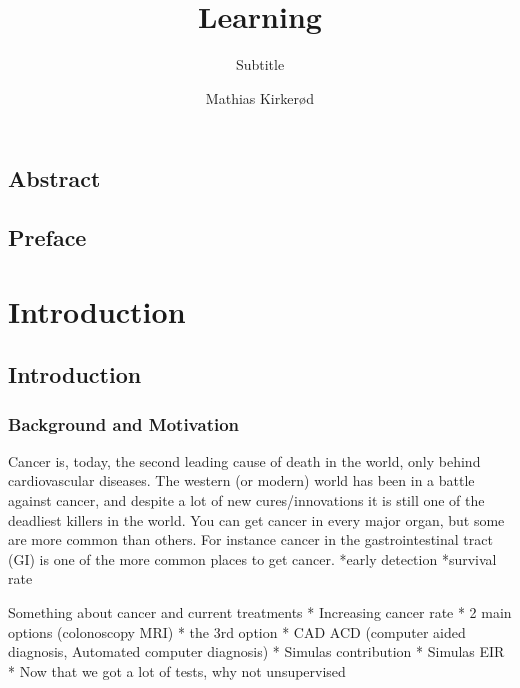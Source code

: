 \documentclass[a4paper,english]{ifimaster}
\title{Learning}
\subtitle{Subtitle}
\author{Mathias Kirkerød}
\begin{document}
\duoforside[dept={Department of Informatics},
program={Informatics: Language and Communication},
long]

\frontmatter{}
\chapter*{Abstract}

\tableofcontents{}
\listoffigures{}
\listoftables{}

\chapter*{Preface}

\mainmatter{}






















\part{Introduction}
\chapter{Introduction}
	\section{Background and Motivation}
	Cancer is, today, the second leading cause of death in the world, only behind cardiovascular
diseases. %
	The western (or modern) world has been in a battle against cancer, and despite a 
	lot of new cures/innovations it is still one of the deadliest killers in the world. 
	You can get cancer in every major organ, but some are more common than others.
	For instance cancer in the gastrointestinal tract (GI) is one of the more common places 
	to get cancer. %
	*early detection
	*survival rate
	
		
		
		
		
		Something about cancer and current treatments 
		* Increasing cancer rate
		* 2 main options (colonoscopy MRI)
		* the 3rd option
		* CAD ACD (computer aided diagnosis, Automated computer diagnosis)
		* Simulas contribution
		* Simulas EIR
		* Now that we got a lot of tests, why not unsupervised
	
\end{document}
